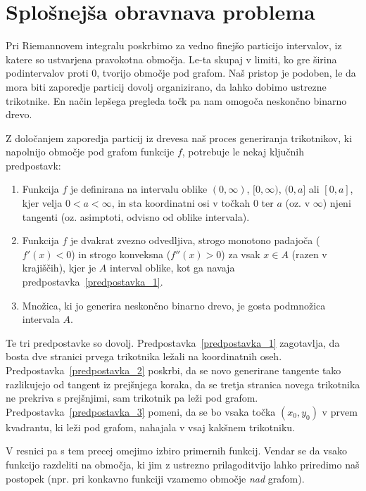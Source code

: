 \documentclass[a4paper, 12pt, titlepage]{article}
\begin{document}
\section{Splošnejša obravnava problema}

Pri Riemannovem integralu poskrbimo za vedno finejšo particijo intervalov, iz katere so ustvarjena pravokotna območja. Le-ta skupaj v limiti, ko gre širina podintervalov proti 0, tvorijo območje pod grafom. Naš pristop je podoben, le da mora biti zaporedje particij dovolj organizirano, da lahko dobimo ustrezne trikotnike. En način lepšega pregleda točk pa nam omogoča neskončno binarno drevo.

Z določanjem zaporedja particij iz drevesa naš proces generiranja trikotnikov, ki napolnijo območje pod grafom funkcije $ f $, potrebuje le nekaj ključnih predpostavk:

\begin{enumerate}
    \item \label{predpostavka_1} Funkcija $ f $ je definirana na intervalu oblike $(0, \infty)$, $[0,\infty)$, $(0,a]$ ali $[0,a]$, kjer velja $ 0 < a < \infty $, in sta koordinatni osi v točkah 0 ter $a$ (oz. v $ \infty $) njeni tangenti (oz. asimptoti, odvisno od oblike intervala).
    \item \label{predpostavka_2} Funkcija $ f $ je dvakrat zvezno odvedljiva, strogo monotono padajoča ($ f'(x) < 0 $) in strogo konveksna ($ f''(x) > 0 $) za vsak $ x \in A$ (razen v krajiščih), kjer je $ A $ interval oblike, kot ga navaja predpostavka~\ref{predpostavka_1}.
    \item \label{predpostavka_3} Množica, ki jo generira neskončno binarno drevo, je gosta podmnožica intervala $ A $.
\end{enumerate}

Te tri predpostavke so dovolj. Predpostavka~\ref{predpostavka_1} zagotavlja, da bosta dve stranici prvega trikotnika ležali na koordinatnih oseh. Predpostavka~\ref{predpostavka_2} poskrbi, da se novo generirane tangente tako razlikujejo od tangent iz prejšnjega koraka, da se tretja stranica novega trikotnika ne prekriva s prejšnjimi, sam trikotnik pa leži pod grafom. Predpostavka~\ref{predpostavka_3} pomeni, da se bo vsaka točka $ (x_0, y_0) $ v prvem kvadrantu, ki leži pod grafom, nahajala v vsaj kakšnem trikotniku.

V resnici pa s tem precej omejimo izbiro primernih funkcij. Vendar se da vsako funkcijo razdeliti na območja, ki jim z ustrezno prilagoditvijo lahko priredimo naš postopek (npr. pri konkavno funkciji vzamemo območje \emph{nad} grafom).
\end{document}
